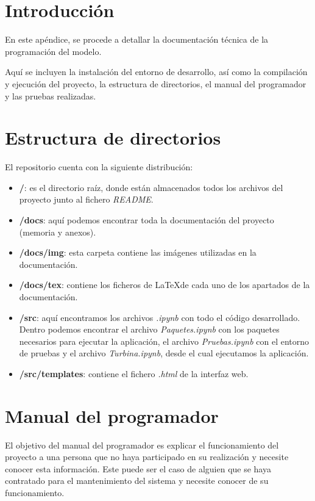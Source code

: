 
\section{Introducción}

En este apéndice, se procede a detallar la documentación técnica de la programación del modelo.

Aquí se incluyen la instalación del entorno de desarrollo, así como la compilación y ejecución del proyecto, la estructura de directorios, el manual del programador y las pruebas realizadas.

\section{Estructura de directorios}

El repositorio cuenta con la siguiente distribución:
\begin{itemize}
    \item \textbf{/}: es el directorio raíz, donde están almacenados todos los archivos del proyecto junto al fichero \textit{README}.
    \item \textbf{/docs}: aquí podemos encontrar toda la documentación del proyecto (memoria y anexos).
    \item \textbf{/docs/img}: esta carpeta contiene las imágenes utilizadas en la documentación.
    \item \textbf{/docs/tex}: contiene los ficheros de \LaTeX de cada uno de los apartados de la documentación.
    \item \textbf{/src}: aquí encontramos los archivos \textit{.ipynb} con todo el código desarrollado. Dentro podemos encontrar el archivo \textit{Paquetes.ipynb} con los paquetes necesarios para ejecutar la aplicación, el archivo \textit{Pruebas.ipynb} con el entorno de pruebas y el archivo \textit{Turbina.ipynb}, desde el cual ejecutamos la aplicación.
    \item \textbf{/src/templates}: contiene el fichero \textit{.html} de la interfaz web.
\end{itemize}


\section{Manual del programador}

El objetivo del manual del programador es explicar el funcionamiento del proyecto a una persona que no haya participado en su realización y necesite conocer esta información. Este puede ser el caso de alguien que se haya contratado para el mantenimiento del sistema y necesite conocer de su funcionamiento.

